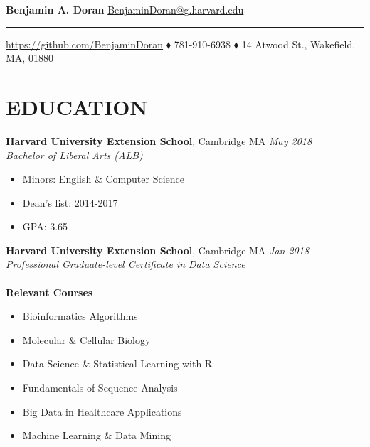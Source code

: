 \documentclass[hidelinks, 10pt]{article}
\begin{document}
\newcommand{\sectiontext}[1]{\bf\color{sectioncolor}#1}
\newcommand{\titletext}[1]{{\large\bf #1}}
\newcommand{\experiencetitle}[4]{
\titletext{#1}, {#2}  \hspace*{\fill} \emph{#3} \\ 
\emph{#4}\vspace{-6pt}
}

\begin{center}
{\huge\bf Benjamin A. Doran} \hspace*{\fill}  
{\color{blue} \href{mailto://BenjaminDoran@g.harvard.edu}{\large BenjaminDoran@g.harvard.edu}}
\hrule
\vspace{6pt}
{\color{blue}\url{https://github.com/BenjaminDoran}} $\blacklozenge$ 781-910-6938 $\blacklozenge$ 14 Atwood St., Wakefield, MA, 01880
\end{center}


\section*{\sectiontext{EDUCATION}}
\begin{addmargin}{.5in}
\experiencetitle{Harvard University Extension School}{Cambridge MA}{May 2018}{Bachelor of Liberal Arts (ALB)}
\begin{itemize}\setlength\itemsep{-4pt}
  \item{Minors: English $\&$ Computer Science}
  \item{Dean's list: 2014-2017}
  \item{GPA: 3.65}
\end{itemize}
\experiencetitle{Harvard University Extension School}{Cambridge MA}{Jan 2018}{Professional Graduate-level Certificate in
Data Science} \\ \\
\titletext{Relevant Courses}
\vspace{-9pt}
\begin{multicols}{2}
  \begin{itemize}\setlength\itemsep{-4pt}
    \item{Bioinformatics Algorithms}
    \item{Molecular $\&$ Cellular Biology}
    \item{Data Science $\&$ Statistical Learning with R}
    \item{Fundamentals of Sequence Analysis}
    \item{Big Data in Healthcare Applications}
    \item{Machine Learning $\&$ Data Mining}
  \end{itemize}
\end{multicols}
\end{addmargin}
\end{document}
